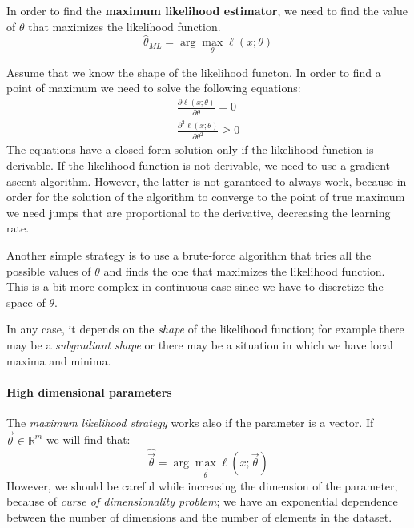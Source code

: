 \begin{theorem}
    In order to find the \textbf{maximum likelihood estimator}, we need to find the value of $\theta$ that maximizes the likelihood function.
    \[
        \hat{\theta}_{ML} = \arg\max_{\theta} \ell(x; \theta)
    \]
\end{theorem}

Assume that we know the shape of the likelihood functon. In order to find a point of maximum we need to solve the following equations:
\begin{align*}
    \frac{\partial \ell(x;\theta)}{\partial \theta} = 0 \\
    \frac{\partial^2 \ell(x;\theta)}{\partial \theta^2} \geq 0
\end{align*}
The equations have a closed form solution only if the likelihood function is derivable. If the likelihood function is not derivable, we need to use a gradient ascent algorithm. However, the latter is not garanteed to always work, because in order for the solution of the algorithm to converge to the point of true maximum we need jumps that are proportional to the derivative, decreasing the learning rate.

Another simple strategy is to use a brute-force algorithm that tries all the possible values of $\theta$ and finds the one that maximizes the likelihood function. This is a bit more complex in continuous case since we have to discretize the space of $\theta$.

In any case, it depends on the \textit{shape} of the likelihood function; for example there may be a \textit{subgradiant shape} or there may be a situation in which we have local maxima and minima.

\paragraph*{High dimensional parameters}
The \textit{maximum likelihood strategy} works also if the parameter is a vector. If $\vec{\theta} \in \mathbb{R}^m$ we will find that:
\[
    \hat{\vec{\theta}} = \arg\max_{\vec{\theta}}  \ell(x; \vec{\theta})
\]
However, we should be careful while increasing the dimension of the parameter, because of \textit{curse of dimensionality problem}; we have an exponential dependence between the number of dimensions and the number of elements in the dataset.

